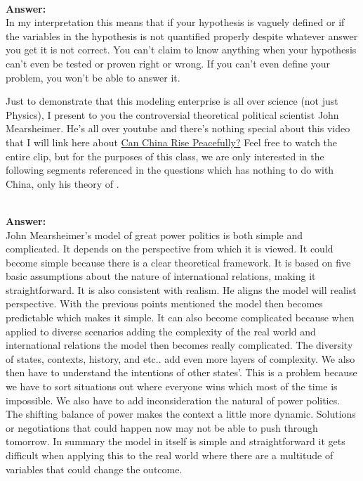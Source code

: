 \documentclass[12pt]{article}
\begin{document}
\begin{enumerate}
 \\
\textbf{Answer: }\\ 
In my interpretation this means that if your hypothesis is vaguely defined or if the variables in the hypothesis is not quantified properly despite whatever answer you get it is not correct. You can't claim to know anything when your hypothesis can't even be tested or proven right or wrong. If you can't even define your problem, you won't be able to answer it. \\ 

Just to demonstrate that this modeling enterprise is all over science (not just Physics), I present to you the controversial theoretical political scientist John Mearsheimer. He's all over youtube and there's nothing special about this video that I will link here about \href{https://www.youtube.com/watch?v=D_Mx_e8t7nU&t=4673s}{Can China Rise Peacefully?} Feel free to watch the entire clip, but for the purposes of this class, we are only interested in the following segments referenced in the questions which has nothing to do with China, only his theory of .

 \\
\textbf{Answer: } \\ 
John Mearsheimer's model of great power politics is both simple and complicated. It depends on the perspective from which it is viewed.
It could become simple because there is a clear theoretical framework. It is based on five basic assumptions about the nature of international relations, making it straightforward. It is also consistent with realism. He aligns the model will realist perspective. With the previous points mentioned the model then becomes predictable which makes it simple. It can also become complicated because when applied to diverse scenarios adding the complexity of the real world and international relations the model then becomes really complicated. The diversity of states, contexts, history, and etc.. add even more layers of complexity. We also then have to understand the intentions of other states'. This is a problem because we have to sort situations out where everyone wins which most of the time is impossible.  We also have to add inconsideration the natural of power politics. The shifting balance of power makes the context a little more dynamic. Solutions or negotiations that could happen now may not be able to push through tomorrow. In summary the model in itself is simple and straightforward it gets difficult when applying this to the real world where there are a multitude of variables that could change the outcome.  \\ 


\end{enumerate}
\end{document}
